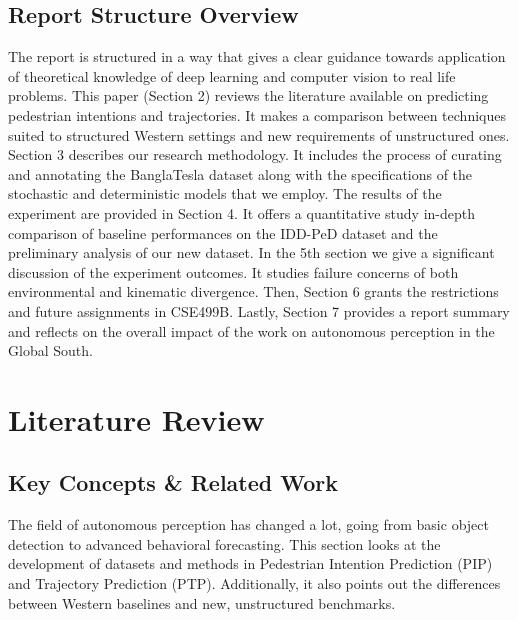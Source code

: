 \documentclass[12pt, a4paper]{article}
\begin{document}
\subsection{Report Structure Overview}
The report is structured in a way that gives a clear guidance towards application of theoretical knowledge of deep learning and computer vision to real life problems. This paper (Section 2) reviews the literature available on predicting pedestrian intentions and trajectories. It makes a comparison between techniques suited to structured Western settings and new requirements of unstructured ones. Section 3 describes our research methodology. It includes the process of curating and annotating the BanglaTesla dataset along with the specifications of the stochastic and deterministic models that we employ. The results of the experiment are provided in Section 4. It offers a quantitative study in-depth comparison of baseline performances on the IDD-PeD dataset and the preliminary analysis of our new dataset. In the 5th section we give a significant discussion of the experiment outcomes. It studies failure concerns of both environmental and kinematic divergence. Then, Section 6 grants the restrictions and future assignments in CSE499B. Lastly, Section 7 provides a report summary and reflects on the overall impact of the work on autonomous perception in the Global South.



\clearpage
\section{Literature Review}

\subsection{Key Concepts \& Related Work}
The field of autonomous perception has changed a lot, going from basic object detection to advanced behavioral forecasting. This section looks at the development of datasets and methods in Pedestrian Intention Prediction (PIP) and Trajectory Prediction (PTP). Additionally, it also points out the differences between Western baselines and new, unstructured benchmarks.
\end{document}
